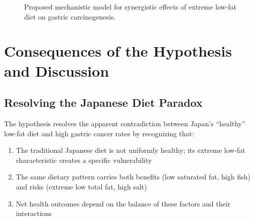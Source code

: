 \documentclass[review]{elsarticle}
\begin{document}
\begin{figure}[h]
\centering
{}
\caption{Proposed mechanistic model for synergistic effects of extreme low-fat diet on gastric carcinogenesis.}
\label{fig:mechanism}
\end{figure}

\section{Consequences of the Hypothesis and Discussion}

\subsection{Resolving the Japanese Diet Paradox}

The hypothesis resolves the apparent contradiction between Japan's ``healthy'' low-fat diet and high gastric cancer rates by recognizing that:

\begin{enumerate}
    \item The traditional Japanese diet is not uniformly healthy; its extreme low-fat characteristic creates a specific vulnerability
    \item The same dietary pattern carries both benefits (low saturated fat, high fish) and risks (extreme low total fat, high salt)
    \item Net health outcomes depend on the balance of these factors and their interactions
\end{enumerate}
\end{document}
